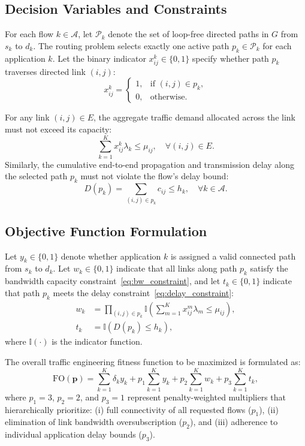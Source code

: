 \documentclass[journal]{IEEEtran}
\newcommand{\FO}{\mathrm{FO}}
\begin{document}
\subsection{Decision Variables and Constraints}
For each flow $k \in \mathcal{A}$, let $\mathcal{P}_k$ denote the set of loop-free directed paths in $G$ from $s_k$ to $d_k$. The routing problem selects exactly one active path $p_k \in \mathcal{P}_k$ for each application $k$. Let the binary indicator $x_{ij}^k \in \{0, 1\}$ specify whether path $p_k$ traverses directed link $(i, j)$:
\begin{equation}
x_{ij}^k = \begin{cases} 1, & \text{if } (i, j) \in p_k, \\ 0, & \text{otherwise.} \end{cases}
\end{equation}

For any link $(i, j) \in E$, the aggregate traffic demand allocated across the link must not exceed its capacity:
\begin{equation}
\sum_{k=1}^K x_{ij}^k \lambda_k \le \mu_{ij}, \quad \forall (i, j) \in E.
\label{eq:bw_constraint}
\end{equation}
Similarly, the cumulative end-to-end propagation and transmission delay along the selected path $p_k$ must not violate the flow's delay bound:
\begin{equation}
D(p_k) = \sum_{(i,j) \in p_k} c_{ij} \le h_k, \quad \forall k \in \mathcal{A}.
\label{eq:delay_constraint}
\end{equation}

\subsection{Objective Function Formulation}
Let $y_k \in \{0, 1\}$ denote whether application $k$ is assigned a valid connected path from $s_k$ to $d_k$. Let $w_k \in \{0, 1\}$ indicate that all links along path $p_k$ satisfy the bandwidth capacity constraint~\eqref{eq:bw_constraint}, and let $t_k \in \{0, 1\}$ indicate that path $p_k$ meets the delay constraint~\eqref{eq:delay_constraint}:
\begin{align}
w_k &= \prod_{(i,j) \in p_k} \mathbb{I}\left( \sum_{m=1}^K x_{ij}^m \lambda_m \le \mu_{ij} \right), \\
t_k &= \mathbb{I}\left( D(p_k) \le h_k \right),
\end{align}
where $\mathbb{I}(\cdot)$ is the indicator function.

The overall traffic engineering fitness function to be maximized is formulated as:
\begin{equation}
\FO(\mathbf{p}) = \sum_{k=1}^K \delta_k y_k + p_1 \sum_{k=1}^K y_k + p_2 \sum_{k=1}^K w_k + p_3 \sum_{k=1}^K t_k,
\label{eq:fitness}
\end{equation}
where $p_1 = 3$, $p_2 = 2$, and $p_3 = 1$ represent penalty-weighted multipliers that hierarchically prioritize: (i) full connectivity of all requested flows ($p_1$), (ii) elimination of link bandwidth oversubscription ($p_2$), and (iii) adherence to individual application delay bounds ($p_3$).
\end{document}
